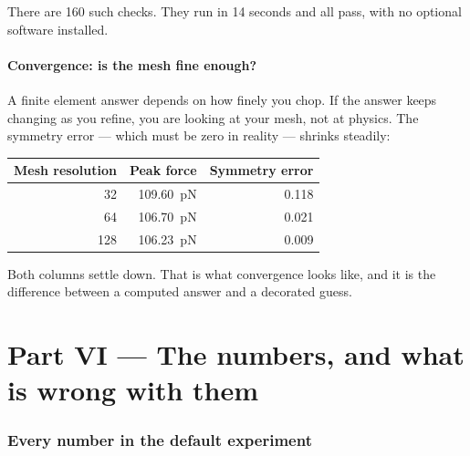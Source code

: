 \documentclass[11pt,a4paper]{article}
\begin{document}
There are 160 such checks. They run in 14 seconds and all pass, with no optional
software installed.

\subsection*{Convergence: is the mesh fine enough?}

A finite element answer depends on how finely you chop. If the answer keeps
changing as you refine, you are looking at your mesh, not at physics. The
symmetry error --- which must be zero in reality --- shrinks steadily:

\begin{center}\small
\begin{tabular}{rrr}
\toprule
\textbf{Mesh resolution} & \textbf{Peak force} & \textbf{Symmetry error} \\
\midrule
32  & \SI{109.60}{\pico\newton} & 0.118 \\
64  & \SI{106.70}{\pico\newton} & 0.021 \\
128 & \SI{106.23}{\pico\newton} & 0.009 \\
\bottomrule
\end{tabular}
\end{center}

Both columns settle down. That is what convergence looks like, and it is the
difference between a computed answer and a decorated guess.

\clearpage
\part*{Part VI --- The numbers, and what is wrong with them}

\section{Every number in the default experiment}
\end{document}
